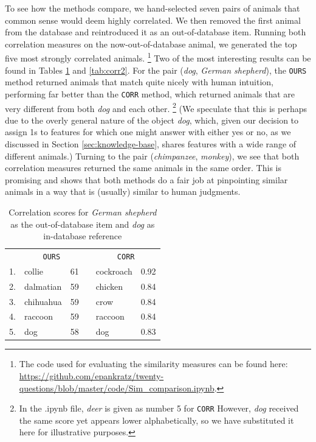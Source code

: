 \documentclass[11pt,a4paper]{article}
\begin{document}
To see how the methods compare, we hand-selected seven pairs of animals that common sense would deem highly correlated. We then removed the first animal from the database and reintroduced it as an out-of-database item. Running both correlation measures on the now-out-of-database animal, we generated the top five most strongly correlated animals.%
    \footnote{The code used for evaluating the similarity measures can be found here:  \url{https://github.com/epankratz/twenty-questions/blob/master/code/Sim_comparison.ipynb}.}
Two of the most interesting results can be found in Tables \ref{tab:corr1} and \ref{tab:corr2}.
For the pair (\textit{dog}, \textit{German shepherd}), the \texttt{OURS} method returned animals that match quite nicely with human intuition, performing far better than the \texttt{CORR} method, which returned animals that are very different from both \textit{dog} and each other.%
    \footnote{In the .ipynb file, \textit{deer} is given as number 5 for \texttt{CORR} However, \textit{dog} received the same score yet appears lower alphabetically, so we have substituted it here for illustrative purposes.}
(We speculate that this is perhaps due to the overly general nature of the object \textit{dog}, which, given our decision to assign 1s to features for which one might answer with either yes or no, as we discussed in Section \ref{sec:knowledge-base}, shares features with a wide range of different animals.) 
Turning to the pair (\textit{chimpanzee}, \textit{monkey}), we see that both correlation measures returned the same animals in the same order. 
This is promising and shows that both methods do a fair job at pinpointing similar animals in a way that is (usually) similar to human judgments.

\begin{table}[h]
    \centering
    \begin{tabular}{clcclc}
    \toprule
    & \multicolumn{2}{c}{\texttt{OURS}} && \multicolumn{2}{c}{\texttt{CORR}} \\
    \cmidrule{2-3} \cmidrule{5-6}
    1. & collie & 61 && cockroach & 0.92 \\
    2. & dalmatian & 59 && chicken & 0.84 \\
    3. & chihuahua & 59 && crow & 0.84 \\
    4. & raccoon & 59 && raccoon & 0.84 \\
    5. & dog & 58 && dog & 0.83 \\
    \bottomrule
    \end{tabular}
\caption{Correlation scores for \textit{German shepherd} as the out-of-database item and \textit{dog} as in-database reference}
\label{tab:corr1}
\end{table}
\end{document}
